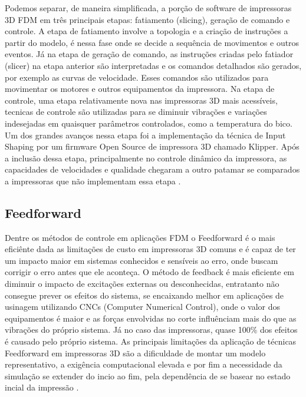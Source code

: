 Podemos separar, de maneira simplificada, a porção de software de impressoras 3D
FDM em três principais etapas: fatiamento (slicing), geração de comando e controle.
A etapa de fatiamento involve a topologia e a criação de instruções a partir do modelo,
é nessa fase onde se decide a sequência de movimentos e outros eventos.
Já na etapa de geração de comando, as instruções criadas pelo fatiador (slicer) na etapa anterior
são interpretadas e os comandos detalhados são gerados, por exemplo as curvas de velocidade.
Esses comandos são utilizados para movimentar os motores e outros equipamentos da impressora.
Na etapa de controle, uma etapa relativamente nova nas impressoras 3D mais acessíveis, 
tecnicas de controle são utilizadas para se diminuir vibrações e variações indesejadas em quaisquer
parâmetros controlados, como a temperatura do bico. Um dos grandes avanços nessa etapa
foi a implementação da técnica de Input Shaping por um firmware Open Source de impressora 3D chamado Klipper.
Após a inclusão dessa etapa, principalmente no controle dinâmico da impressora, as capacidades
de velocidades e qualidade chegaram a outro patamar se comparados a impressoras que não implementam essa etapa \cite{klipperdoc}.


\subsection{Feedforward}
Dentre os métodos de controle em aplicações FDM o Feedforward 
é o mais eficiênte dada as limitações de custo em impressoras 
3D comuns e é capaz de ter um impacto maior em sistemas 
conhecidos e sensíveis ao erro, onde buscam corrigir o erro 
antes que ele aconteça. O método de feedback é mais eficiente em
diminuir o impacto de excitações externas ou desconhecidas,
entratanto não consegue prever os efeitos do sistema, se encaixando
melhor em aplicações de usinagem utilizando CNCs (Computer Numerical Control),
onde o valor dos equipamentos é maior e as forças envolvidas no corte
influênciam mais do que as vibrações do próprio sistema.
Já no caso das impressoras, quase 100\% dos efeitos é causado pelo próprio
sistema. As principais limitações da aplicação de técnicas Feedforward
em impressoras 3D são a dificuldade de montar um modelo representativo,
a exigência computacional elevada e por fim a necessidade da simulação
se extender do incio ao fim, pela dependência de se basear no estado 
incial da impressão \cite{ramani20,duan18}.

